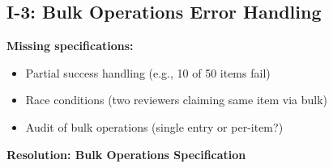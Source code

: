\subsection{I-3: Bulk Operations Error Handling}
\label{sec:i3-bulk-operations}

\begin{tcolorbox}[colback=orange!5,colframe=orange!70,title=\faIcon{exclamation-circle} Finding I-3: Bulk Operations Gaps]
\textbf{Missing specifications:}
\begin{itemize}
    \item Partial success handling (e.g., 10 of 50 items fail)
    \item Race conditions (two reviewers claiming same item via bulk)
    \item Audit of bulk operations (single entry or per-item?)
\end{itemize}
\end{tcolorbox}

\textbf{Resolution: Bulk Operations Specification}

